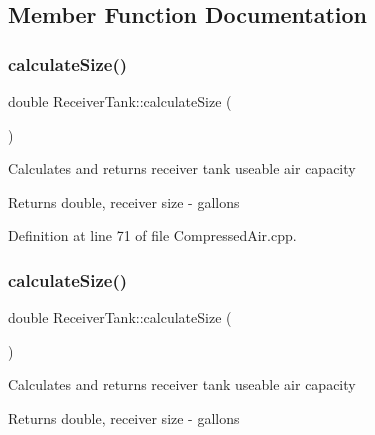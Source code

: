 \subsection{Member Function Documentation}
\mbox{\label{class_receiver_tank_a5841344b63c444e4ceb9c3b7daeaf613}} 
\subsubsection{\texorpdfstring{calculate\+Size()}{calculateSize()}\hspace{0.1cm}{\footnotesize\ttfamily [1/3]}}
{\footnotesize\ttfamily double Receiver\+Tank\+::calculate\+Size (\begin{DoxyParamCaption}{ }\end{DoxyParamCaption})}

Calculates and returns receiver tank useable air capacity \begin{DoxyReturn}{Returns}
double, receiver size -\/ gallons 
\end{DoxyReturn}


Definition at line 71 of file Compressed\+Air.\+cpp.

\mbox{\label{class_receiver_tank_a5841344b63c444e4ceb9c3b7daeaf613}} 
\subsubsection{\texorpdfstring{calculate\+Size()}{calculateSize()}\hspace{0.1cm}{\footnotesize\ttfamily [2/3]}}
{\footnotesize\ttfamily double Receiver\+Tank\+::calculate\+Size (\begin{DoxyParamCaption}{ }\end{DoxyParamCaption})}

Calculates and returns receiver tank useable air capacity \begin{DoxyReturn}{Returns}
double, receiver size -\/ gallons 
\end{DoxyReturn}
\mbox{\label{class_receiver_tank_a5841344b63c444e4ceb9c3b7daeaf613}} 
